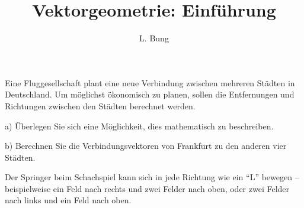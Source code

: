 \documentclass[11pt, a4paper, oneside]{article}
\begin{document}
	\author{L. Bung}
	\title{Vektorgeometrie: Einführung}
	\subject{Mathematik}
	\maketitle
	
	
	Eine Fluggesellschaft plant eine neue Verbindung zwischen mehreren Städten in Deutschland.
	Um möglichst ökonomisch zu planen, sollen die Entfernungen und Richtungen zwischen den Städten berechnet werden.

	\begin{figure}[H]
		\centering
	\end{figure}
	a) Überlegen Sie sich eine Möglichkeit, dies mathematisch zu beschreiben.

	\checkered[4.5cm]
	
	\boxarea[10cm]
	
	b) Berechnen Sie die Verbindungsvektoren von Frankfurt zu den anderen vier Städten.
	
	\checkered[10cm]
	
	
	Der Springer beim Schachspiel kann sich in jede Richtung wie ein ``L'' bewegen -- beispielweise ein Feld nach rechts und zwei Felder nach oben, oder zwei Felder nach links und ein Feld nach oben.
	
\end{document}
